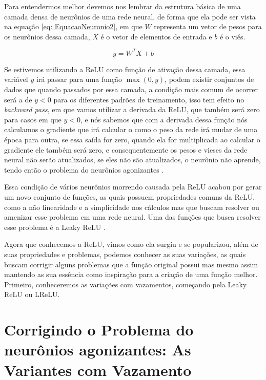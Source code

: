 Para entendermos melhor devemos nos lembrar da estrutura básica de uma camada densa de neurônios de uma rede neural, de forma que ela pode ser vista na equação \ref{eq: EquacaoNeuronio2}, em que $W$ representa um vetor de pesos para os neurônios dessa camada, $X$ é o vetor de elementos de entrada e $b$ é o viés.

\begin{equation}
    y = W^T X + b
    \label{eq: EquacaoNeuronio2}
\end{equation}

Se estivemos utilizando a ReLU como função de ativação dessa camada, essa variável $y$ irá passar para uma função $\max(0, y)$, podem existir conjuntos de dados que quando passados por essa camada, a condição mais comum de ocorrer será a de $y < 0$ para os diferentes padrões de treinamento, isso tem efeito no \textit{backward pass}, em que vamos utilizar a derivada da ReLU, que também será zero para casos em que $y < 0$, e nós sabemos que com a derivada dessa função nós calculamos o gradiente que irá calcular o como o peso da rede irá mudar de uma época para outra, se essa saída for zero, quando ela for multiplicada ao calcular o gradiente ele também será zero, e consequentemente os pesos e vieses da rede neural não serão atualizados, se eles não são atualizados, o neurônio não aprende, tendo então o problema do neurônios agonizantes \parencite{DyingReluDouglas}.

Essa condição de vários neurônios morrendo causada pela ReLU acabou por gerar um novo conjunto de funções, as quais possuem propriedades comuns da ReLU, como a não linearidade e a simplicidade nos cálculos mas que buscam resolver ou amenizar esse problema em uma rede neural. Uma das funções que busca resolver esse problema é a Leaky ReLU \parencite{DyingReluDouglas}.

Agora que conhecemos a ReLU, vimos como ela surgiu e se popularizou, além de suas propriedades e problemas, podemos conhecer as suas variações, as quais buscam corrigir alguns problemas que a função original possui mas mesmo assim mantendo as sua essência como inspiração para a criação de uma função melhor. Primeiro, conheceremos as variações com vazamentos, começando pela Leaky ReLU ou LReLU.

\section{Corrigindo o Problema do neurônios agonizantes: As Variantes com Vazamento}

